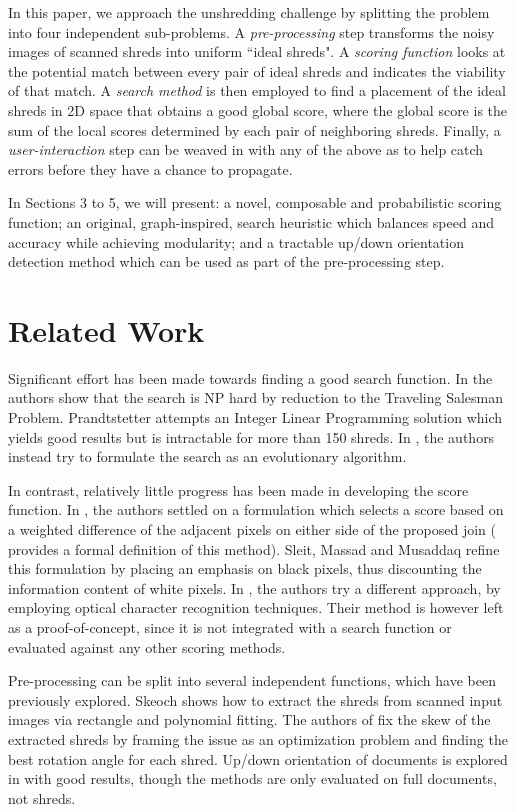 \documentclass{llncs}
\begin{document}
In this paper, we approach the unshredding challenge by splitting the problem into four independent sub-problems. A \emph{pre-processing} step transforms the noisy images of scanned shreds into uniform ``ideal shreds". A \emph{scoring function} looks at the potential match between every pair of ideal shreds and indicates the viability of that match. A \emph{search method} is then employed to find a placement of the ideal shreds in 2D space that obtains a good global score, where the global score is the sum of the local scores determined by each pair of neighboring shreds. Finally, a \emph{user-interaction} step can be weaved in with any of the above as to help catch errors before they have a chance to propagate.

 In Sections 3 to 5, we will present: a novel, composable and probabilistic scoring function; an original, graph-inspired, search heuristic which balances speed and accuracy while achieving modularity; and a tractable up/down orientation detection method which can be used as part of the pre-processing step.

\section{Related Work}
Significant effort has been made towards finding a good search function. In \cite{P1} the authors show that the search is NP hard by reduction to the Traveling Salesman Problem. Prandtstetter \cite{P2} attempts an Integer Linear Programming solution which yields good results but is intractable for more than 150 shreds. In \cite{P3,P4}, the authors instead try to formulate the search as an evolutionary algorithm. 

In contrast, relatively little progress has been made in developing the score function. In \cite{P1,P2,P3,P4,P7}, the authors settled on a formulation which selects a score based on a weighted difference of the adjacent pixels on either side of the proposed join (\cite{P7} provides a formal definition of this method). Sleit, Massad and Musaddaq \cite{P5} refine this formulation by placing an emphasis on black pixels, thus discounting the information content of white pixels. In \cite{P8}, the authors try a different approach, by employing optical character recognition techniques. Their method is however left as a proof-of-concept, since it is not integrated with a search function or evaluated against any other scoring methods.

Pre-processing can be split into several independent functions, which have been previously explored. Skeoch \cite{P9} shows how to extract the shreds from scanned input images via rectangle and polynomial fitting. The authors of \cite{P10} fix the skew of the extracted shreds by framing the issue as an optimization problem and finding the best rotation angle for each shred. Up/down orientation of documents is explored in \cite{P11,P12} with good results, though the methods are only evaluated on full documents, not shreds.
\end{document}
